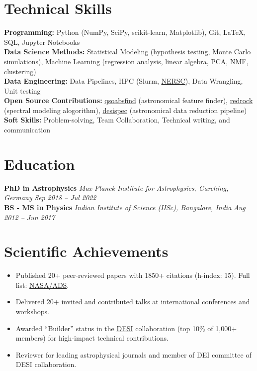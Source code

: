 \documentclass[a4paper,10pt]{article}
\begin{document}
\vspace*{-4mm}
\section*{Technical Skills}
\textcolor{sectionblue}{\textbf{Programming:}} Python (NumPy, SciPy, scikit-learn, Matplotlib), Git, LaTeX, SQL, Jupyter Notebooks \\
\textcolor{sectionblue}{\textbf{Data Science Methods:}} Statistical Modeling (hypothesis testing, Monte Carlo simulations), Machine Learning (regression analysis, linear algebra, PCA, NMF, clustering)\\
\textcolor{sectionblue}{\textbf{Data Engineering:}} Data Pipelines, HPC (Slurm, \href{https://www.nersc.gov}{NERSC}), Data Wrangling, Unit testing\\
\textcolor{sectionblue}{\textbf{Open Source Contributions:}} \href{https://github.com/abhi0395/qsoabsfind}{qsoabsfind} (astronomical feature finder), \href{https://github.com/desihub/redrock}{redrock} (spectral modeling alogorithm), \href{https://github.com/desihub/desispec}{desispec} (astronomical data reduction pipeline)\\
\textcolor{sectionblue}{\textbf{Soft Skills:}} Problem-solving, Team Collaboration, Technical writing, and communication
\vspace*{-2mm}

\section*{Education}

\textcolor{sectionblue}{\textbf{PhD in Astrophysics}} \hfill \textit{Max Planck Institute for Astrophysics, Garching, Germany} \hfill \textit{Sep 2018 – Jul 2022}\\
\textcolor{sectionblue}{\textbf{BS - MS in Physics}} \hfill \textit{Indian Institute of Science (IISc), Bangalore, India} \hfill \textit{Aug 2012 – Jun 2017}
\vspace*{-2mm}

\section*{Scientific Achievements}
\begin{itemize}
    \item Published 20+ peer-reviewed papers with 1850+ citations (h-index: 15). Full list: \href{https://ui.adsabs.harvard.edu/public-libraries/YPXGQEsNQg-zR9R9YBYFXw}{NASA/ADS}.
    \vspace*{-1mm}
    \item Delivered 20+ invited and contributed talks at international conferences and workshops.
    \vspace*{-1mm}
    \item Awarded “Builder” status in the \href{https://en.wikipedia.org/wiki/Dark_Energy_Spectroscopic_Instrument}{DESI} collaboration (top 10\% of 1,000+ members) for high-impact technical contributions.
    \vspace*{-1mm}
    \item Reviewer for leading astrophysical journals and member of DEI committee of DESI collaboration.
\end{itemize}
\end{document}
